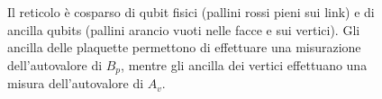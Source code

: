 \begin{figure}[!ht]
	\centering	
	 \quad
	 \quad
	\caption{Il reticolo è cosparso di qubit fisici (pallini rossi pieni sui link) e di ancilla qubits (pallini arancio vuoti nelle facce e sui vertici). Gli ancilla delle plaquette permettono di effettuare una misurazione dell'autovalore di $B_p$, mentre gli ancilla dei vertici effettuano una misura dell'autovalore di $A_v$.}
    \label{fig:ancilla_toric}
\end{figure}

